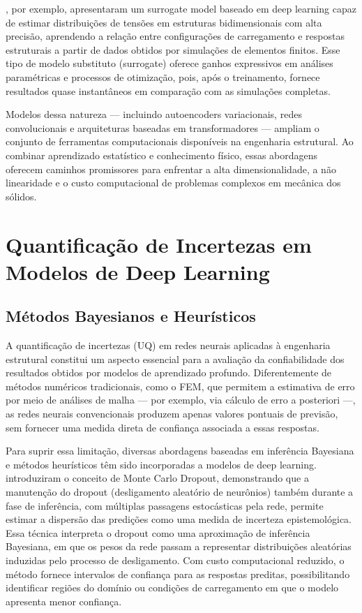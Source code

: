 \documentclass[12pt,openright,oneside,a4paper,english,brazil]{abntex2}
\begin{document}
\textcite{liang2018}, por exemplo, apresentaram um surrogate model baseado em deep learning capaz de estimar distribuições de tensões em estruturas bidimensionais com alta precisão, aprendendo a relação entre configurações de carregamento e respostas estruturais a partir de dados obtidos por simulações de elementos finitos. Esse tipo de modelo substituto (surrogate) oferece ganhos 
expressivos em análises paramétricas e processos de otimização, pois, após o treinamento, fornece resultados quase instantâneos em comparação com as simulações completas.

Modelos dessa natureza — incluindo autoencoders variacionais, redes convolucionais e arquiteturas baseadas em transformadores — ampliam o conjunto de ferramentas computacionais disponíveis na engenharia estrutural. Ao combinar aprendizado estatístico e conhecimento físico, essas abordagens oferecem caminhos promissores para enfrentar a alta dimensionalidade, a não linearidade e o custo 
computacional de problemas complexos em mecânica dos sólidos.

\section{Quantificação de Incertezas em Modelos de Deep Learning}

\subsection{Métodos Bayesianos e Heurísticos}

A quantificação de incertezas (UQ) em redes neurais aplicadas à engenharia estrutural constitui um aspecto essencial para a avaliação da confiabilidade dos resultados obtidos por modelos de aprendizado profundo. Diferentemente de métodos numéricos tradicionais, como o FEM, que permitem a estimativa de erro por meio de análises de malha — por exemplo, via cálculo de erro a posteriori —, 
as redes neurais convencionais produzem apenas valores pontuais de previsão, sem fornecer uma medida direta de confiança associada a essas respostas.

Para suprir essa limitação, diversas abordagens baseadas em inferência Bayesiana e métodos heurísticos têm sido incorporadas a modelos de deep learning. \textcite{gal2016} introduziram o conceito de Monte Carlo Dropout, demonstrando que a manutenção do dropout (desligamento aleatório de neurônios) também durante a fase de inferência, com múltiplas passagens estocásticas pela rede, permite 
estimar a dispersão das predições como uma medida de incerteza epistemológica. Essa técnica interpreta o dropout como uma aproximação de inferência Bayesiana, em que os pesos da rede passam a representar distribuições aleatórias induzidas pelo processo de desligamento. Com custo computacional reduzido, o método fornece intervalos de confiança para as respostas preditas, possibilitando 
identificar regiões do domínio ou condições de carregamento em que o modelo apresenta menor confiança.
\end{document}
